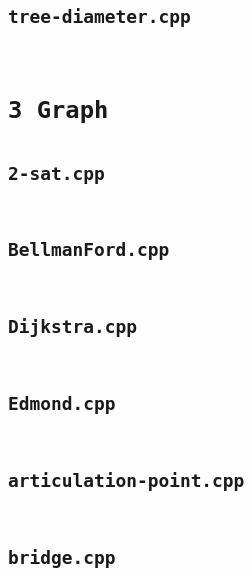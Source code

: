 \subsection*{\texttt{tree-diameter.cpp}} \label{sec:2_2_Tree_file6}
\inputminted[fontsize=\footnotesize, linenos, breaklines]{cpp}{./2\ Tree/tree-diameter.cpp}

\section*{\texttt{3 Graph}} \label{sec:3_3_Graph}
\subsection*{\texttt{2-sat.cpp}} \label{sec:3_3_Graph_file0}
\inputminted[fontsize=\footnotesize, linenos, breaklines]{cpp}{./3\ Graph/2-sat.cpp}

\subsection*{\texttt{BellmanFord.cpp}} \label{sec:3_3_Graph_file1}
\inputminted[fontsize=\footnotesize, linenos, breaklines]{cpp}{./3\ Graph/BellmanFord.cpp}

\subsection*{\texttt{Dijkstra.cpp}} \label{sec:3_3_Graph_file2}
\inputminted[fontsize=\footnotesize, linenos, breaklines]{cpp}{./3\ Graph/Dijkstra.cpp}

\subsection*{\texttt{Edmond.cpp}} \label{sec:3_3_Graph_file3}
\inputminted[fontsize=\footnotesize, linenos, breaklines]{cpp}{./3\ Graph/Edmond.cpp}

\subsection*{\texttt{articulation-point.cpp}} \label{sec:3_3_Graph_file4}
\inputminted[fontsize=\footnotesize, linenos, breaklines]{cpp}{./3\ Graph/articulation-point.cpp}

\subsection*{\texttt{bridge.cpp}} \label{sec:3_3_Graph_file5}
\inputminted[fontsize=\footnotesize, linenos, breaklines]{cpp}{./3\ Graph/bridge.cpp}

